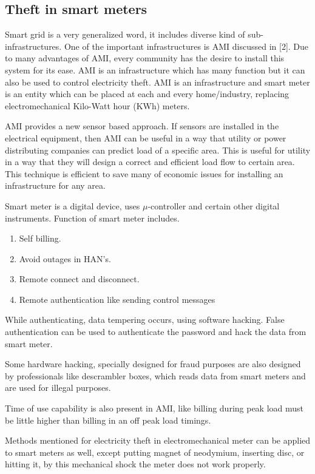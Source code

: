 \documentclass[10pt, conference, compsocconf]{IEEEtran}
\begin{document}
\subsection{Theft in smart meters}
Smart grid is a very generalized word, it includes diverse kind of sub-infrastructures. One of the important infrastructures is AMI discussed in [2]. Due to many advantages of AMI, every community has the desire to install this system for its ease. AMI is an infrastructure which has many function but it can also be used to control electricity theft. AMI is an infrastructure and smart meter is an entity which can be placed at each and every home/industry, replacing electromechanical Kilo-Watt hour (KWh) meters.

AMI provides a new sensor based approach. If sensors are installed in the electrical equipment, then AMI can be useful in a way that utility or power distributing companies can predict load of a specific area. This is useful for utility in a way that they will design a correct and efficient load flow to certain area. This technique is efficient to save many of economic issues for installing an infrastructure for any area.

Smart meter is a digital device, uses $\mu$-controller and certain other digital instruments. Function of smart meter includes.
\begin{enumerate}
\item
Self billing.
\item
Avoid outages in HAN's.
\item
Remote connect and disconnect.
\item
Remote authentication like sending control messages
\end{enumerate}

While authenticating, data tempering occurs, using software hacking. False authentication can be used to authenticate the password and hack the data from smart meter.

Some hardware hacking, specially designed for fraud purposes are also designed by professionals like descrambler boxes, which reads data from smart meters and are used for illegal purposes.

Time of use capability is also present in AMI, like billing during peak load must be little higher than billing in an off peak load timings.

Methods mentioned for electricity theft in electromechanical meter can be applied to smart meters as well, except putting magnet of neodymium, inserting disc, or hitting it, by this mechanical shock the meter does not work properly.
\end{document}
